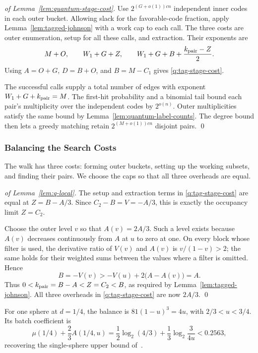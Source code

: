 \documentclass[runningheads,envcountsame,envcountsect,orivec]{llncs}
\begin{document}
\begin{proof}[of Lemma~\ref{lem:quantum-stage-cost}]
Use $2^{(G+o(1))cn}$ independent inner codes in each outer bucket.
Allowing slack for the favorable-code fraction, apply
Lemma~\ref{lem:tagged-johnson} with a work cap to each call.
The three costs are outer enumeration, setup for all these
calls, and extraction. Their exponents are
\[
 M+O,\qquad W_1+G+Z,\qquad
 W_1+G+B+\frac{k_{\rm pair}-Z}{2}.
\]
Using $A=O+G$, $D=B+O$, and $B=M-C_1$ gives
\eqref{q:tag-stage-cost}.

The successful calls supply a total number of edges with
exponent $W_1+G+k_{\rm pair}=M$. The first-hit probability
and a binomial tail bound each pair's multiplicity over the
independent codes by $2^{o(n)}$. Outer multiplicities satisfy
the same bound by Lemma~\ref{lem:quantum-label-counts}.
The degree bound then lets a greedy matching retain
$2^{(M+o(1))cn}$ disjoint pairs.
\qed
\end{proof}

\subsubsection{Balancing the Search Costs}


The walk has three costs: forming outer buckets, setting up
the working subsets, and finding their pairs. We choose the
caps so that all three overheads are equal.



\begin{proof}[of Lemma~\ref{lem:q-local}]
The setup and extraction terms in \eqref{q:tag-stage-cost}
are equal at $Z=B-A/3$. Since $C_2-B=V=-A/3$, this is
exactly the occupancy limit $Z=C_2$.

Choose the outer level $v$ so that $A(v)=2A/3$. Such a level
exists because $A(v)$ decreases continuously from $A$ at $u$
to zero at one. On every block whose filter is used, the derivative ratio
of $V(v)$ and $A(v)$ is $v/(1-v)>2$; the same holds for
their weighted sums between the values where a filter is omitted. Hence
\[
 B=-V(v)>-V(u)+2\bigl(A-A(v)\bigr)=A.
\]
Thus $0<k_{\rm pair}=B-A<Z=C_2<B$, as required by
Lemma~\ref{lem:tagged-johnson}. All three overheads in
\eqref{q:tag-stage-cost} are now $2A/3$.
\qed
\end{proof}

For one sphere at $d=1/4$, the balance is $81(1-u)^3=4u$,
with $2/3<u<3/4$. Its batch coefficient is
\[
 \mu(1/4)+\frac23A(1/4,u)
 =\frac12\log_2(4/3)+\frac13\log_2\frac{3}{4u}<0.2563,
\]
recovering the single-sphere upper bound of~\cite{BCSS23}.
\end{document}
